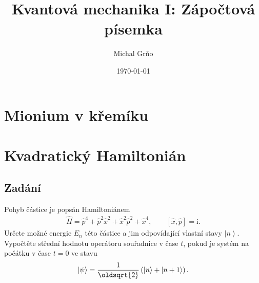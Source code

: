 \documentclass[10pt,a4paper]{article}
\newcommand{\comm}[2]{\left[ #1, #2 \right]}
\newcommand{\const}[1]{\text{#1}}
\newcommand{\ket}[1]{\left| #1 \right>}
\renewcommand{\i}{\const{i}}
\begin{document}
\title{Kvantová mechanika I: Zápočtová písemka}
\author{Michal Grňo}
\date{\today}

\maketitle

\section{Mionium v křemíku}



\section{Kvadratický Hamiltonián}
\subsection{Zadání}
Pohyb částice je popsán Hamiltoniánem
\begin{align*}
    \hat{H}
    = \hat{p}^4
    + \hat{p}^2 \hat{x}^2
    + \hat{x}^2 \hat{p}^2
    + \hat{x}^4,
    \hspace{2em}
    \comm{\hat{x}}{\hat{p}} = \i.
\end{align*}
Určete možné energie $E_n$ této částice a jim odpovídající vlastní stavy $\ket{n}$. Vypočtěte střední hodnotu operátoru souřadnice v čase $t$, pokud je systém na počátku v čase $t=0$ ve stavu
\begin{align*}
    \ket{\psi} =
    \frac{1}{\oldsqrt{2}}
    \left( \ket{n} + \ket{n+1} \right).
\end{align*}
\end{document}
